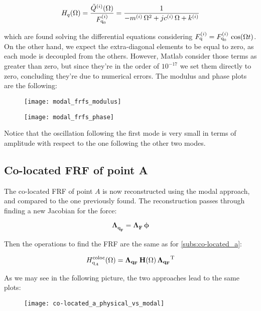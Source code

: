 \documentclass[a4paper,12pt,oneside]{article}
\begin{document}
\[
	H_q(\Omega) = \frac{\tilde{Q}^{(i)}(\Omega)}{F_{\textup{q}_0}^{(i)}} =
	\frac{1}{-m^{(i)} \, \Omega^2 + j c^{(i)} \, \Omega + k^{(i)}}
\]

which are found solving the differential equations considering $ F_\textup{q}^{(i)} = F_{\textup{q}_0}^{(i)} \, \cos(\Omega t) $. On the other hand, we expect the extra-diagonal elements  to be equal to zero, as each  mode is decoupled from the others. However, Matlab consider those terms as greater than zero, but since they're in the order of $ 10^{-17} $ we set them directly to zero, concluding they're due to numerical errors. The modulus and phase plots are the following:

\clearpage

\begin{figure}
	\hspace{-70pt}
	\texttt{[image: modal\_frfs\_modulus]}
\end{figure}

\begin{figure}[H]
	\hspace{-70pt}
	\texttt{[image: modal\_frfs\_phase]}
\end{figure}

Notice that the oscillation following the first mode is very small in terms of amplitude with respect to the one following the other two modes.

\clearpage

\subsection{Co-located FRF of point A}

The co-located FRF of point $ A $ is now reconstructed using the modal approach, and compared to the one previously found. The reconstruction passes through finding a new Jacobian for the force:

\[
	\mathbf{\Lambda_{q_F}} = \mathbf{\Lambda_F} \, \bm{\phi}
\]

Then the operations to find the FRF are the same as for \ref{subs:co-located_a}:

\[
	H^\textup{coloc}_{\textup{q}_A}(\Omega) =
		\mathbf{\Lambda_{q_F}} \, \mathbf{H}(\Omega) \,
		\mathbf{\Lambda_{q_F}}^\textup{T}
\]

As we may see in the following picture, the two approaches lead to the same plots:

\begin{figure}[h]
	\hspace{-70pt}
	\texttt{[image: co-located\_a\_physical\_vs\_modal]}
\end{figure}
\end{document}
